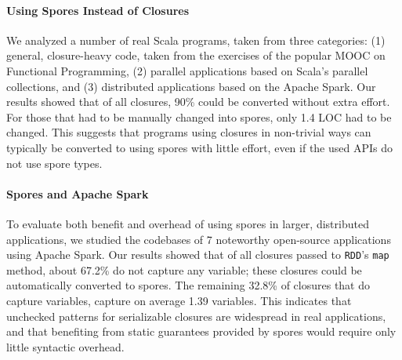 \documentclass[english]{lni}
\begin{document}
\vspace{-5mm}
\paragraph{Using Spores Instead of Closures}
We analyzed a number of real Scala programs, taken from three categories: (1)
general, closure-heavy code, taken from the exercises of the popular MOOC on
Functional Programming, (2) parallel applications based on Scala's parallel
collections, and (3) distributed applications based on the Apache Spark. Our
results showed that of all closures, 90\% could be converted without extra
effort. For those that had to be manually changed into spores, only 1.4 LOC
had to be changed. This suggests that programs using closures in non-trivial
ways can typically be converted to using spores with little effort, even if
the used APIs do not use spore types.

\vspace{-5mm}
\paragraph{Spores and Apache Spark}
To evaluate both benefit and overhead of using spores in larger, distributed
applications, we studied the codebases of 7 noteworthy open-source
applications using Apache Spark. Our results showed that of all closures
passed to \verb|RDD|'s \verb|map| method, about 67.2\% do not capture any
variable; these closures could be automatically converted to spores. The
remaining 32.8\% of closures that do capture variables, capture on average
1.39 variables. This indicates that unchecked patterns for serializable
closures are widespread in real applications, and that benefiting from static
guarantees provided by spores would require only little syntactic overhead.


\end{document}
